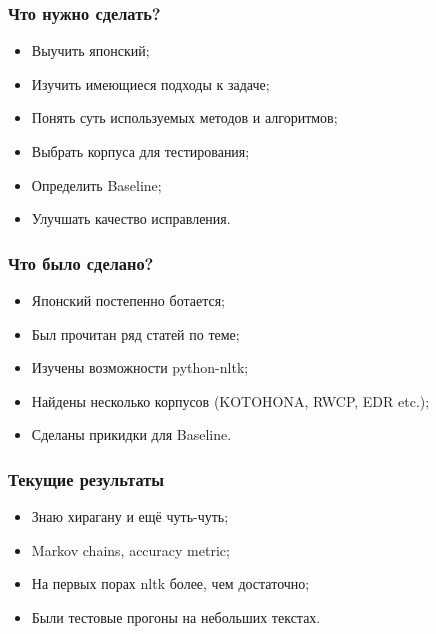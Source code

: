 \documentclass[14pt]{beamer}
\begin{document}
\begin{frame}
\frametitle{Что нужно сделать?}
\begin{itemize}
    \item Выучить японский;
    \item Изучить имеющиеся подходы к задаче;
    \item Понять суть используемых методов и алгоритмов;
    \item Выбрать корпуса для тестирования;
    \item Определить Baseline;
    \item Улучшать качество исправления.
\end{itemize}
\end{frame}

\begin{frame}
\frametitle{Что было сделано?}
\begin{itemize}
    \item Японский постепенно ботается;
    \item Был прочитан ряд статей по теме;
    \item Изучены возможности python-nltk;
    \item Найдены несколько корпусов (KOTOHONA, RWCP, EDR etc.);
    \item Сделаны прикидки для Baseline.
\end{itemize}
\end{frame}

\begin{frame}
\frametitle{Текущие результаты}
\begin{itemize}
  \item Знаю хирагану и ещё чуть-чуть;
  \item Markov chains, accuracy metric;
  \item На первых порах nltk более, чем достаточно;
  \item Были тестовые прогоны на небольших текстах.
\end{itemize}
\end{frame}



\end{document}
